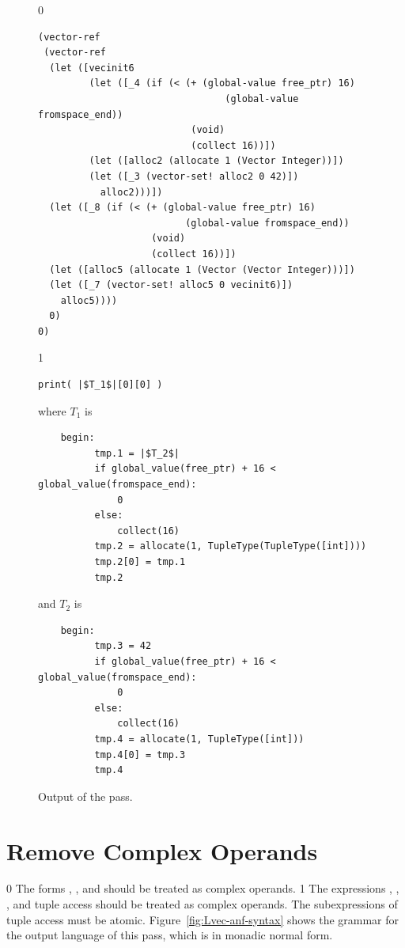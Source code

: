 \documentclass[7x10]{TimesAPriori_MIT}%
\def\racketEd{0}
\def\pythonEd{1}
\def\edition{1}
\newcommand{\pythonColor}[0]{}
\numberwithin{theorem}{chapter}
\numberwithin{definition}{chapter}
\numberwithin{equation}{chapter}
\begin{document}
\begin{figure}[tbp]
  \begin{tcolorbox}[colback=white]
{\if\edition\racketEd
\begin{lstlisting}
(vector-ref
 (vector-ref
  (let ([vecinit6
         (let ([_4 (if (< (+ (global-value free_ptr) 16)
                                 (global-value fromspace_end))
                           (void)
                           (collect 16))])
         (let ([alloc2 (allocate 1 (Vector Integer))])
         (let ([_3 (vector-set! alloc2 0 42)])
           alloc2)))])
  (let ([_8 (if (< (+ (global-value free_ptr) 16)
                          (global-value fromspace_end))
                    (void)
                    (collect 16))])
  (let ([alloc5 (allocate 1 (Vector (Vector Integer)))])
  (let ([_7 (vector-set! alloc5 0 vecinit6)])
    alloc5))))
  0)
0)
\end{lstlisting}
\fi}
{\if\edition\pythonEd\pythonColor
\begin{lstlisting}
print( |$T_1$|[0][0] )
\end{lstlisting}
where $T_1$ is
\begin{lstlisting}
    begin:
          tmp.1 = |$T_2$|
          if global_value(free_ptr) + 16 < global_value(fromspace_end):
              0
          else:
              collect(16)
          tmp.2 = allocate(1, TupleType(TupleType([int])))
          tmp.2[0] = tmp.1
          tmp.2
\end{lstlisting}
and $T_2$ is
\begin{lstlisting}
    begin:
          tmp.3 = 42
          if global_value(free_ptr) + 16 < global_value(fromspace_end):
              0
          else:
              collect(16)
          tmp.4 = allocate(1, TupleType([int]))
          tmp.4[0] = tmp.3
          tmp.4
\end{lstlisting}
\fi}
  \end{tcolorbox}
\caption{Output of the  pass.}
\label{fig:expose-alloc-output}
\end{figure}


\section{Remove Complex Operands}
\label{sec:remove-complex-opera-Lvec}

{\if\edition\racketEd
%
The forms , , and 
should be treated as complex operands.
%
\fi}
%
{\if\edition\pythonEd\pythonColor
%
The expressions , , ,
and tuple access should be treated as complex operands.  The
subexpressions of tuple access must be atomic.
%
\fi}
Figure~\ref{fig:Lvec-anf-syntax}
shows the grammar for the output language \LangAllocANF{} of this
pass, which is \LangAlloc{} in monadic normal form.
\end{document}
